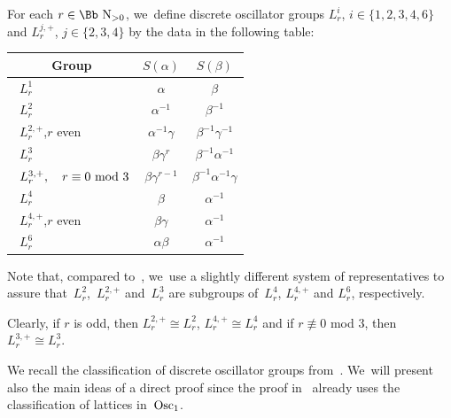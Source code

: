 \documentclass[10pt,a4paper]{amsart}
\newcommand\NN{{\mbox{\Bb N}}}
\newcommand{\Osc}{{\rm Osc}}
\numberwithin{equation}{section}
\begin{document}
For each $r\in \NN_{>0}$, we~define discrete oscillator groups $L^i_r$, $i\in\{1,2,3,4,6\}$ and $L^{j,+}_r$, $j\in\{2,3,4\}$ by the data in the following table:
\begin{center}
{\renewcommand{\arraystretch}{1.5}
\begin{tabular}{l|c|c} \hline	
\multicolumn{1}{c|}{Group}		& $S(\alpha)$ 			& $S(\beta)$ 		\\
\hline
\ $L^1_r$ & $\alpha$ & $\beta$ \\ \hline
\ $L^2_r$ & $\alpha^{-1}$ & $\beta^{-1}$ \\ \hline
\ $L^{2,+}_r$,\quad $r$ even & $\alpha^{-1}\gamma$ & $\beta^{-1}\gamma^{-1}$ \\ \hline
\ $L^3_r$ & $\beta\gamma^r$ & $\beta^{-1}\alpha^{-1}$ \\ \hline
\ $L^{3,+}_r,\quad r\equiv 0\ {\rm mod}\ 3$ & $\beta\gamma^{r-1}$ & $\beta^{-1}\alpha^{-1}\gamma$ \\ \hline
\ $L^4_r$ & $\beta$ & $\alpha^{-1}$ \\ \hline
\ $L^{4,+}_r$,\quad $r$ even & $\beta\gamma$ & $\alpha^{-1}$ \\ \hline
\ $L^6_r$ & $\alpha\beta$ & $\alpha^{-1}$ \\ \hline
\end{tabular}}
\end{center}
Note that, compared to~\cite{F}, we~use a slightly different system of representatives to assure that~$L^{2}_r$,~$L^{2,+}_r$ and~$L^{3}_r$ are subgroups of~$L^{4}_r$, $L^{4,+}_r$ and $L^{6}_r$, respectively.

Clearly, if $r$ is odd, then $L^{2,+}_r\cong L^{2}_r$, $L^{4,+}_r\cong L^{4}_r$ and if $r\not\equiv 0$ mod $3$, then $L^{3,+}_r\cong L^{3}_r$.

We recall the classification of discrete oscillator groups from~\cite{F}. We~will present also the main ideas of a direct proof since the proof in~\cite{F} already uses the classification of lattices in~$\Osc_1$.
\end{document}
